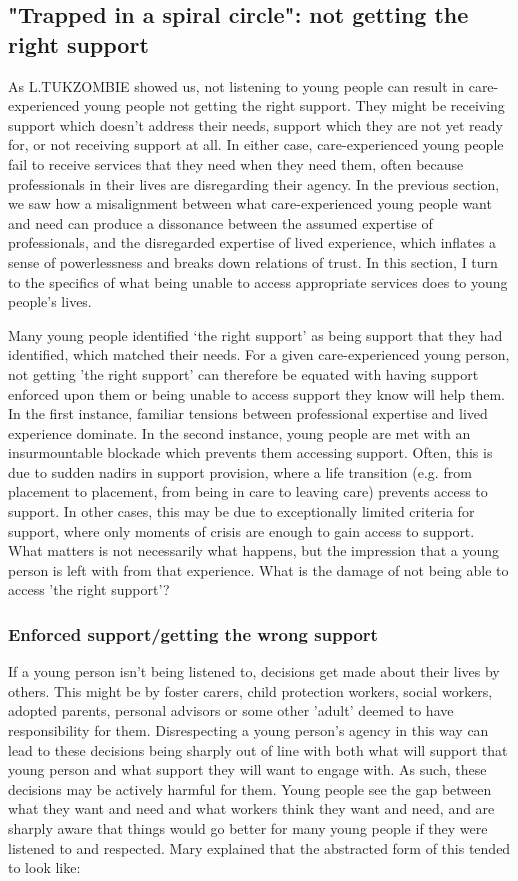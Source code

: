 \subsection{"Trapped in a spiral circle": not getting the right support}
As L.TUKZOMBIE showed us, not listening to young people can result in care-experienced young people not getting the right support. They might be receiving support which doesn’t address their needs, support which they are not yet ready for, or not receiving support at all. In either case, care-experienced young people fail to receive services that they need when they need them, often because professionals in their lives are disregarding their agency. In the previous section, we saw how a misalignment between what care-experienced young people want and need can produce a dissonance between the assumed expertise of professionals, and the disregarded expertise of lived experience, which inflates a sense of powerlessness and breaks down relations of trust. In this section, I turn to the specifics of what being unable to access appropriate services does to young people's lives.

Many young people identified ‘the right support' as being support that they had identified, which matched their needs. For a given care-experienced young person, not getting 'the right support' can therefore be equated with having support enforced upon them or being unable to access support they know will help them. In the first instance, familiar tensions between professional expertise and lived experience dominate. In the second instance, young people are met with an insurmountable blockade which prevents them accessing support. Often, this is due to sudden nadirs in support provision, where a life transition (e.g. from placement to placement, from being in care to leaving care) prevents access to support. In other cases, this may be due to exceptionally limited criteria for support, where only moments of crisis are enough to gain access to support. What matters is not necessarily what happens, but the impression that a young person is left with from that experience. What is the damage of not being able to access 'the right support'?

\subsubsection{Enforced support/getting the wrong support}
If a young person isn't being listened to, decisions get made about their lives by others. This might be by foster carers, child protection workers, social workers, adopted parents, personal advisors or some other 'adult' deemed to have responsibility for them. Disrespecting a young person's agency in this way can lead to these decisions being sharply out of line with both what will support that young person and what support they will want to engage with. As such, these decisions may be actively harmful for them. Young people see the gap between what they want and need and what workers think they want and need, and are sharply aware that things would go better for many young people if they were listened to and respected. Mary explained that the abstracted form of this tended to look like:

